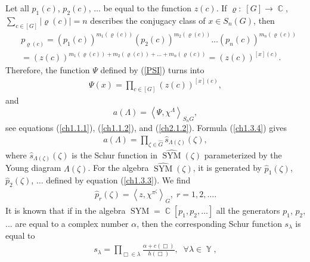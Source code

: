 \documentclass[12pt]{amsart}
\theoremstyle{definition}
\numberwithin{equation}{section}
\DeclareMathOperator{\SYM}{SYM}
\DeclareMathOperator{\Y}{\mathbb{Y}}
\DeclareMathOperator{\C}{\mathbb{C}}
\begin{document}
Let all $p_1(c)$, $p_2(c)$, $\ldots$ be equal to the function $z(c)$. If
$\varrho:\;[G]\longrightarrow\C$, $\sum\limits_{c\in[G]}|\varrho(c)|=n$
describes the conjugacy class of $x\in S_n(G)$, then
\begin{equation}\label{ch2.1.1}
\begin{split}
&p_{\varrho(c)}=(p_1(c))^{m_1(\varrho(c))}
(p_2(c))^{m_2(\varrho(c))}\ldots(p_n(c))^{m_n(\varrho(c))}\\
&=\left(z(c)\right)^{m_1(\varrho(c))+m_2(\varrho(c))+\ldots+m_n(\varrho(c))}
=(z(c))^{[x](c)}.
\end{split}
\end{equation}
Therefore, the function $\Psi$ defined by (\ref{PSI}) turns into
\begin{equation}\label{ch2.1.2}
\begin{split}
\Psi(x)
=\prod\limits_{c\in[G]}(z(c))^{[x](c)},
\end{split}
\end{equation}
and
$$
a(\Lambda)=\left<\Psi,\chi^{\Lambda}\right>_{S_n{G}},
$$
see equations (\ref{ch1.1.1}), (\ref{ch1.1.2}),
and (\ref{ch2.1.2}). Formula (\ref{ch1.3.4}) gives
\begin{equation}\label{ch2.1.3}
\begin{split}
a(\Lambda)=\prod\limits_{\zeta\in\widehat{G}}\widehat{s}_{\Lambda(\zeta)}(\zeta),
\end{split}
\end{equation}
where $\widehat{s}_{\Lambda(\zeta)}(\zeta)$ is the Schur function in $\widehat{\SYM}(\zeta)$
parameterized by the Young diagram $\Lambda(\zeta)$. For the algebra $\widehat{\SYM}(\zeta)$,
it is generated by $\widehat{p}_1(\zeta)$, $\widehat{p}_2(\zeta)$, $\ldots$ defined by equation (\ref{ch1.3.3}). We find
\begin{equation}\label{ch2.1.4}
\begin{split}
\widehat{p}_r(\zeta)=\left<z,\chi^{\pi^\zeta}\right>_G,\; r=1,2,\ldots.
\end{split}
\end{equation}
It is known that if in the algebra $\SYM=\C[p_1,p_2,\ldots]$ all the generators
$p_1$, $p_2$, $\ldots$ are equal to a complex number $\alpha$, then the corresponding
Schur function $s_{\lambda}$ is equal to
\begin{equation}\label{ch2.1.5}
\begin{split}
s_{\lambda}
=\prod\limits_{\Box\in\lambda}\frac{\alpha+c(\Box)}{h(\Box)},\;\; \forall \lambda\in\Y,
\end{split}
\end{equation}
\end{document}
